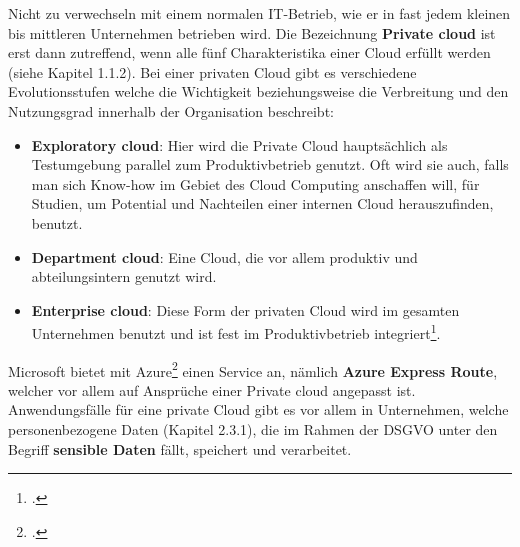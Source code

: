Nicht zu verwechseln mit einem normalen IT-Betrieb, wie er in fast jedem kleinen bis mittleren Unternehmen betrieben wird. Die Bezeichnung \textbf{Private cloud} ist erst dann zutreffend, wenn alle fünf Charakteristika einer Cloud erfüllt werden (siehe Kapitel 1.1.2).
Bei einer privaten Cloud gibt es verschiedene Evolutionsstufen welche die Wichtigkeit beziehungsweise die Verbreitung und den Nutzungsgrad innerhalb der Organisation beschreibt:
\begin{itemize}
	\item \textbf{Exploratory cloud}: Hier wird die Private Cloud hauptsächlich als Testumgebung parallel zum Produktivbetrieb genutzt. Oft wird sie auch, falls man sich Know-how im Gebiet des Cloud Computing anschaffen will, für Studien, um Potential und Nachteilen einer internen Cloud herauszufinden, benutzt.
	\item \textbf{Department cloud}: Eine Cloud, die vor allem produktiv und abteilungsintern genutzt wird.
	\item \textbf{Enterprise cloud}: Diese Form der privaten Cloud wird im gesamten Unternehmen benutzt und ist fest im Produktivbetrieb integriert\footcite{Lehrunterlagen-HTL-cloud}.
\end{itemize}

Microsoft bietet mit Azure\footcite{cloud-ms-privat} einen Service an, nämlich \textbf{Azure Express Route}, welcher vor allem auf Ansprüche einer Private cloud angepasst ist.
Anwendungsfälle für eine private Cloud gibt es vor allem in Unternehmen, welche personenbezogene Daten (Kapitel 2.3.1), die im Rahmen der DSGVO unter den Begriff \textbf{sensible Daten} fällt, speichert und verarbeitet.

